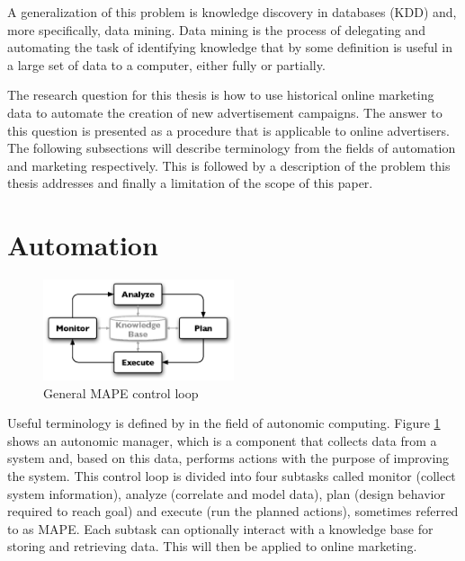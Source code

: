 \documentclass[11pt,a4paper]{report}
\begin{document}
A generalization of this problem is knowledge discovery in databases (KDD) and, more specifically, data mining. Data mining is the process of delegating and automating the task of identifying knowledge that by some definition is useful in a large set of data to a computer, either fully or partially.

The research question for this thesis is how to use historical online marketing data to automate the creation of new advertisement campaigns. The answer to this question is presented as a procedure that is applicable to online advertisers. The following subsections will describe terminology from the fields of automation and marketing respectively. This is followed by a description of the problem this thesis addresses and finally a limitation of the scope of this paper.

\section{Automation}
\begin{figure}[htb] \centering \includegraphics[width=0.5\textwidth]{mape.eps}
	\caption{General MAPE control loop}
	\label{fig:MAPE}
\end{figure}

Useful terminology is defined by \citet{IBM2006} in the field of autonomic computing. Figure \ref{fig:MAPE} shows an autonomic manager, which is a component that collects data from a system and, based on this data, performs actions with the purpose of improving the system. This control loop is divided into four subtasks called monitor (collect system information), analyze (correlate and model data), plan (design behavior required to reach goal) and execute (run the planned actions), sometimes referred to as MAPE. Each subtask can optionally interact with a knowledge base for storing and retrieving data. This will then be applied to online marketing.
\end{document}

